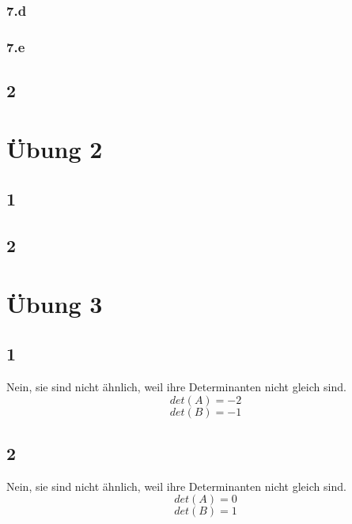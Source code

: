 \documentclass[10pt,a4paper]{article}
\begin{document}
\subsubsection*{7.d}

\subsubsection*{7.e}

\subsection*{2}

\section*{Übung 2}

\subsection*{1}

\subsection*{2}

\section*{Übung 3}

\subsection*{1}

Nein, sie sind nicht ähnlich, weil ihre Determinanten nicht gleich sind.
\begin{equation}
det(A) = -2
\end{equation}
\begin{equation}
det(B) = -1
\end{equation}

\subsection*{2}

Nein, sie sind nicht ähnlich, weil ihre Determinanten nicht gleich sind.
\begin{equation}
det(A) = 0
\end{equation}
\begin{equation}
det(B) = 1
\end{equation}
\end{document}
